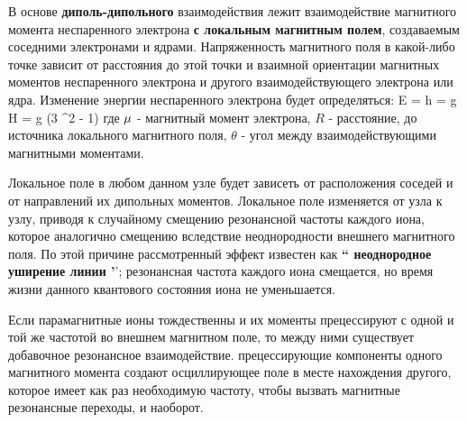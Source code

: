 \documentclass{beamer}
\begin{document}
\begin{frame}
\scriptsize{
В основе \textbf{диполь-дипольного} взаимодействия лежит взаимодействие магнитного момента неспаренного электрона \textbf{с локальным магнитным полем}, создаваемым соседними электронами и ядрами. Напряженность магнитного поля в какой-либо точке зависит от расстояния до этой точки и взаимной ориентации магнитных моментов неспаренного электрона и другого взаимодействующего электрона или ядра. Изменение энергии неспаренного электрона будет определяться:
\beq \label{utro_5.34}
\Delta E = h \Delta \nu = g \beta \Delta H = g \beta {} (3 \cos ^{2} \theta - 1)
\eeq
где $\mu$ - магнитный момент электрона, $R$ - расстояние, до источника локального магнитного поля, $\theta$ - угол между взаимодействующими магнитными моментами.

Локальное поле в любом данном узле будет зависеть от расположения соседей и от направлений их дипольных моментов. Локальное поле изменяется от узла к узлу, приводя к случайному смещению резонансной частоты каждого иона, которое аналогично смещению вследствие неоднородности внешнего магнитного поля. По этой причине рассмотренный эффект известен как \textbf{ `` неоднородное уширение линии '}'; резонансная частота каждого иона смещается, но время жизни данного квантового состояния иона не уменьшается.

Если парамагнитные ионы тождественны и их моменты прецессируют с одной и той же частотой во внешнем магнитном поле, то между ними существует добавочное  резонансное взаимодействие. прецессирующие компоненты одного магнитного момента создают осциллирующее поле в месте нахождения другого, которое имеет как раз необходимую частоту, чтобы вызвать магнитные резонансные переходы, и наоборот.
}
\end{frame}
\end{document}
